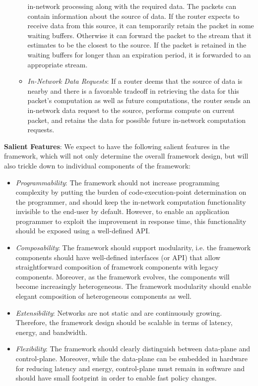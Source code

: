 \documentclass[10pt,letter,twocolumn]{article}
\begin{document}
\begin{itemize}
\begin{itemize}
in-network processing along with the required data. The packets can contain information
about the source of data. If the router expects to receive data from this source, it can
temporarily retain the packet in some waiting buffers. Otherwise it can forward the packet
to the stream that it estimates to be the closest to the source. If the packet is retained
in the waiting buffers for longer than an expiration period, it is forwarded to an
appropriate stream.
\item \textit{In-Network Data Requests}: If a router deems that the source of data is nearby
and there is a favorable tradeoff in retrieving the data for this packet’s computation as
well as future computations, the router sends an in-network data request to the source,
performs compute on current packet, and retains the data for possible future in-network
computation requests.
\end{itemize}
\end{itemize}

\textbf{Salient Features}: We expect to have the following salient features in the framework,
which will not only determine the overall framework design, but will also trickle down to
individual components of the framework:
\begin{itemize}
\item \textit{Programmability}: The framework should not increase programming complexity by
putting the burden of code-execution-point determination on the programmer, and should keep
the in-network computation functionality invisible to the end-user by default. However, to
enable an application programmer to exploit the improvement in response time, this
functionality should be exposed using a well-defined API.
\item \textit{Composability}: The framework should support modularity, i.e. the framework
components should have well-defined interfaces (or API) that allow straightforward composition
of framework components with legacy components. Moreover, as the framework evolves, the
components will become increasingly heterogeneous. The framework modularity should enable
elegant composition of heterogeneous components as well.
\item \textit{Extensibility}: Networks are not static and are continuously growing. Therefore,
the framework design should be scalable in terms of latency, energy, and bandwidth.
\item \textit{Flexibility}: The framework should clearly distinguish between data-plane and
control-plane. Moreover, while the data-plane can be embedded in hardware for reducing latency
and energy, control-plane must remain in software and should have small footprint in order to
enable fast policy changes.
\end{itemize}
\end{document}
